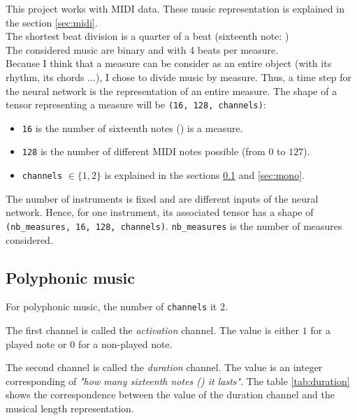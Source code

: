 \documentclass[12pt]{report}
\begin{document}
This project works with MIDI data. These music representation is explained in the section \ref{sec:midi}. \\
The shortest beat division is a quarter of a beat (sixteenth note: \musSixteenth) \\
The considered music are binary and with 4 beats per measure. \\
Because I think that a measure can be consider as an entire object (with its rhythm, its chords ...), I chose to divide music by measure. Thus, a time step for the neural network is the representation of an entire measure.
The shape of a tensor representing a measure will be \texttt{(16, 128, channels)}:
\begin{itemize}
    \item \texttt{16} is the number of sixteenth notes (\musSixteenth) is a measure.
    \item \texttt{128} is the number of different MIDI notes possible (from $0$ to $127$).
    \item \texttt{channels} $\in \{1, 2\}$ is explained in the sections \ref{sec:poly} and \ref{sec:mono}.
\end{itemize}

The number of instruments is fixed and are different inputs of the neural network.
Hence, for one instrument, its associated tensor has a shape of \texttt{(nb\_measures, 16, 128, channels)}. \texttt{nb\_measures} is the number of measures considered.

\subsection{Polyphonic music}
\label{sec:poly}

For polyphonic music, the number of \texttt{channels} it $2$.

The first channel is called the \textit{activation} channel. The value is either $1$ for a played note or $0$ for a non-played note.

The second channel is called the \textit{duration} channel. The value is an integer corresponding of \textit{"how many sixteenth notes (\musSixteenth) it lasts"}.
The table \ref{tab:duration} shows the correspondence between the value of the duration channel and the musical length representation.
\end{document}
